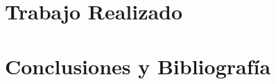 \documentclass[10pt]{book}
\begin{document}
	\chapter{Trabajo Realizado}
	\label{chapter:trabajo}
	
	
	
	\chapter{Conclusiones y Bibliografía}
	\label{chapter:referencias}
	
	
	
	



%	

    \appendix

    \clossing
	\cdtSaveData    
\end{document}
